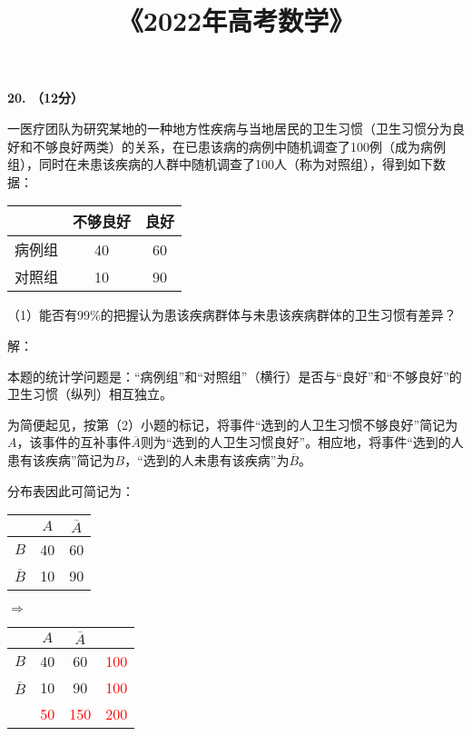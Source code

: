 \documentclass[a4paper,12pt]{article}
\title{《2022年高考数学》}
\begin{document}
\maketitle

\setcounter{section}{19}

\textbf{20. （12分）}

一医疗团队为研究某地的一种地方性疾病与当地居民的卫生习惯（卫生习惯分为良好和不够良好两类）的关系，在已患该病的病例中随机调查了100例（成为病例组），同时在未患该疾病的人群中随机调查了100人（称为对照组），得到如下数据：
\begin{center}
    \begin{tabular}{c c c}
    \hline
                & 不够良好 & 良好 \\
    \hline
        病例组  & 40    & 60 \\
        对照组  & 10    & 90 \\
    \hline
    \end{tabular}
\end{center}

（1）能否有99\%的把握认为患该疾病群体与未患该疾病群体的卫生习惯有差异？

\color{blue}
解：

本题的统计学问题是：“病例组”和“对照组”（横行）是否与“良好”和“不够良好”的卫生习惯（纵列）相互独立。

为简便起见，按第（2）小题的标记，将事件“选到的人卫生习惯不够良好”简记为$A$，该事件的互补事件$\overline{A}$则为“选到的人卫生习惯良好”。相应地，将事件“选到的人患有该疾病”简记为$B$，“选到的人未患有该疾病”为$\overline{B}$。

分布表因此可简记为：

\begin{tabular}{c c c}
    \hline
                & $A$ & $\overline{A}$ \\
    \hline
        $B$  & 40    & 60 \\
        $\overline{B}$  & 10    & 90 \\
    \hline
\end{tabular}
$\Rightarrow$
\begin{tabular}{c c c c}
    \hline
                & $A$ & $\overline{A}$ & \\
    \hline
        $B$  & 40    & 60 & \textcolor{red}{100}\\
        $\overline{B}$  & 10    & 90 & \textcolor{red}{100}\\
    \hline
        & \textcolor{red}{50} & \textcolor{red}{150} & \textcolor{red}{200}
\end{tabular}
\end{document}
